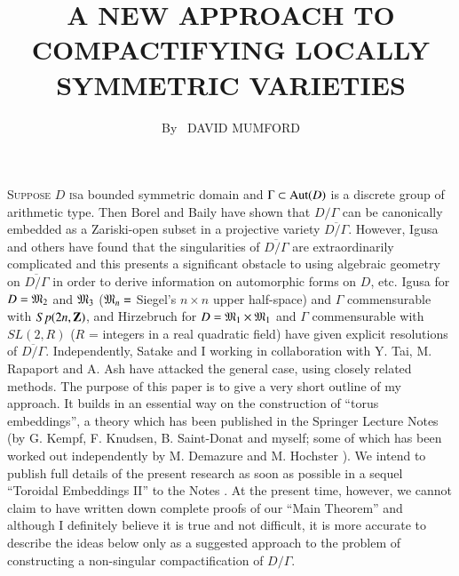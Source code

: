 
\title{A NEW APPROACH TO COMPACTIFYING LOCALLY SYMMETRIC VARIETIES}

\author{By~ DAVID MUMFORD}

\date{}
\maketitle


\setcounter{page}{224}
\setcounter{pageoriginal}{210}

\textsc{Suppose $D$ is}\pageoriginale a bounded symmetric domain and $\Gamma \subset \operatorname{Aut} (D)$ is a discrete group of arithmetic type. Then Borel and Baily \cite{art8-key2} have shown that $D/\Gamma$ can be canonically embedded as a Zariski-open subset in a projective variety $\overline{D/\Gamma}$. However, Igusa  \cite{art8-key6} and others have found that the singularities of $\overline{D/ \Gamma}$ are extraordinarily complicated and this presents a significant obstacle to using algebraic geometry on $\overline{D/ \Gamma}$ in order to derive information on automorphic forms on $D$, etc. Igusa \cite{art8-key7} for $D = \mathfrak{M}_2$ and $\mathfrak{M}_3$ ($\mathfrak{M}_n =$ Siegel's $n \times n$ upper half-space) and $\Gamma$ commensurable with $Sp (2n ,\mathbf{Z})$, and  Hirzebruch \cite{art8-key4} for $D = \mathfrak{M}_1 \times \mathfrak{M}_1$ and $\Gamma$ commensurable with $SL(2, R)$ ($R$ = integers in a real quadratic field) have given explicit resolutions of $\overline{D/ \Gamma}$. Independently, Satake \cite{art8-key9} and I working in collaboration with Y. Tai, M. Rapaport and A. Ash have attacked the general case, using closely related methods. The purpose of this paper is to give a very short outline of my approach. It builds in an essential way on the construction of ``torus embeddings'', a theory which has been published in the Springer Lecture Notes \cite{art8-key8} (by G. Kempf, F. Knudsen, B. Saint-Donat and myself; some of which has been worked out independently by M. Demazure \cite{art8-key3} and M. Hochster \cite{art8-key5}). We intend to publish full details of the present research as soon as possible in a sequel ``Toroidal Embeddings II'' to the Notes \cite{art8-key8}. At the present time, however, we cannot claim to have written down complete proofs of our ``Main Theorem'' and although I definitely believe it is true and not difficult, it is more accurate to describe the ideas below only as a suggested approach to the problem of constructing a non-singular compactification of $D/ \Gamma$.

